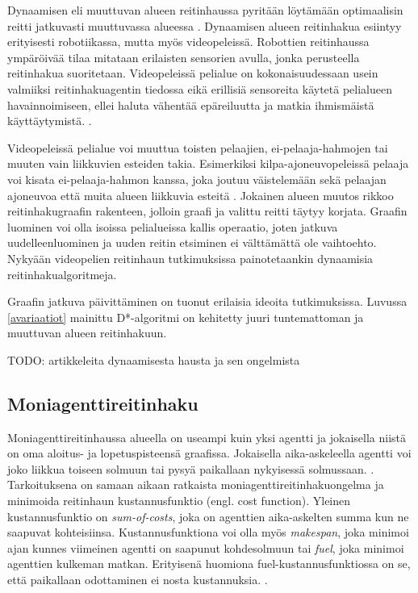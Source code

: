 \documentclass[utf8]{gradu3}
\begin{document}
Dynaamisen eli muuttuvan alueen reitinhaussa pyritään löytämään optimaalisin reitti jatkuvasti muuttuvassa alueessa \parencite{lawande2022systematic}. Dynaamisen alueen reitinhakua esiintyy erityisesti robotiikassa, mutta myös videopeleissä. Robottien reitinhaussa ympäröivää tilaa mitataan erilaisten sensorien avulla, jonka perusteella reitinhakua suoritetaan. Videopeleissä pelialue on kokonaisuudessaan usein valmiiksi reitinhakuagentin tiedossa eikä erillisiä sensoreita käytetä pelialueen havainnoimiseen, ellei haluta vähentää epäreiluutta ja matkia ihmismäistä käyttäytymistä. \parencite{rahmani2022towards}.

Videopeleissä pelialue voi muuttua toisten pelaajien, ei-pelaaja-hahmojen tai muuten vain liikkuvien esteiden takia. Esimerkiksi kilpa-ajoneuvopeleissä pelaaja voi kisata ei-pelaaja-hahmon kanssa, joka joutuu väistelemään sekä pelaajan ajoneuvoa että muita alueen liikkuvia esteitä \parencite{sazaki2017pathfinding}. Jokainen alueen muutos rikkoo reitinhakugraafin rakenteen, jolloin graafi ja valittu reitti täytyy korjata. Graafin luominen voi olla isoissa pelialueissa kallis operaatio, joten jatkuva uudelleenluominen ja uuden reitin etsiminen ei välttämättä ole vaihtoehto. Nykyään videopelien reitinhaun tutkimuksissa painotetaankin dynaamisia reitinhakualgoritmeja.

Graafin jatkuva päivittäminen on tuonut erilaisia ideoita tutkimuksissa. Luvussa \ref{avariaatiot} mainittu D*-algoritmi on kehitetty juuri tuntemattoman ja muuttuvan alueen reitinhakuun.

TODO: artikkeleita dynaamisesta hausta ja sen ongelmista

\subsection{Moniagenttireitinhaku}

Moniagenttireitinhaussa alueella on useampi kuin yksi agentti ja jokaisella niistä on oma aloitus- ja lopetuspisteensä graafissa. Jokaisella aika-askeleella agentti voi joko liikkua toiseen solmuun tai pysyä paikallaan nykyisessä solmussaan. \parencite{sharon2015conflict,stern2019multi}. Tarkoituksena on samaan aikaan ratkaista moniagenttireitinhakuongelma ja minimoida reitinhaun kustannusfunktio (engl. cost function). Yleinen kustannusfunktio on \textit{sum-of-costs}, joka on agenttien aika-askelten summa kun ne saapuvat kohteisiinsa. Kustannusfunktiona voi olla myös \textit{makespan}, joka minimoi ajan kunnes viimeinen agentti on saapunut kohdesolmuun tai \textit{fuel}, joka minimoi agenttien kulkeman matkan. Erityisenä huomiona fuel-kustannusfunktiossa on se, että paikallaan odottaminen ei nosta kustannuksia. \parencite{sharon2015conflict}.
\end{document}
